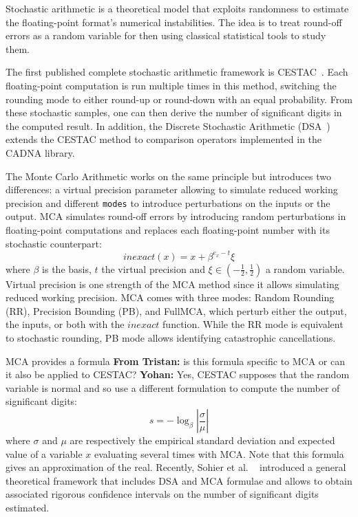 \documentclass[11pt]{article}
\newcommand{\tristan}[1]{\color{orange}\textbf{From Tristan:} #1\color{black}\xspace}
\newcommand{\Yohan}[1]{\color{green!75!black}\textbf{Yohan:} #1\color{black}\xspace}
\begin{document}

Stochastic arithmetic is a theoretical model that exploits randomness to estimate the floating-point format's numerical instabilities. The idea is to treat round-off errors as a random variable for then using classical statistical tools to study them.

The first published complete stochastic arithmetic framework is CESTAC~\cite{vignes1993stochastic}. Each floating-point computation is run multiple times in this method, switching the rounding mode to either round-up or round-down with
an equal probability. From these stochastic samples, one can then derive the number of significant digits in the computed result. In addition, the Discrete Stochastic Arithmetic (DSA~\cite{vignes2004discrete}) extends the CESTAC method to comparison operators implemented in the CADNA library.

The Monte Carlo Arithmetic works on the same principle but introduces two differences:
a virtual precision parameter allowing to simulate reduced working precision and different \texttt{modes} to introduce perturbations
on the inputs or the output.
MCA simulates round-off errors by introducing random perturbations in floating-point computations and replaces each floating-point number with its stochastic counterpart:
\[
inexact(x) =  x + \beta^{e_x - t}\xi
\]
where $\beta$ is the basis, $t$ the virtual precision and $\xi \in (-\frac{1}{2},\frac{1}{2})$ a random variable.
Virtual precision is one strength of the MCA method since it allows simulating reduced working precision.
MCA comes with three modes: Random Rounding (RR), Precision Bounding (PB), and FullMCA, which perturb either the output, the inputs, or both with the $inexact$ function. While the RR mode is equivalent to stochastic rounding, PB mode allows identifying catastrophic cancellations.

MCA provides a formula \tristan{is this formula specific to MCA or can it also be applied to CESTAC?} \Yohan{Yes, CESTAC supposes that the random variable is normal and so use a different formulation} to compute the number of significant digits:
\begin{equation}
s = -\log_{\beta}{ \left| \dfrac{\sigma}{\mu} \right|} \label{eq:sig-digits}
\end{equation}
where $\sigma$ and $\mu$ are respectively the empirical standard deviation and expected value of a variable $x$ evaluating 
several times with MCA. 
Note that this formula gives an approximation of the real. Recently, Sohier et al. ~\cite{sohier2018confidence} introduced a 
general theoretical framework that includes DSA and MCA formulae and allows to obtain associated rigorous confidence intervals on the number of significant digits estimated.
\end{document}
